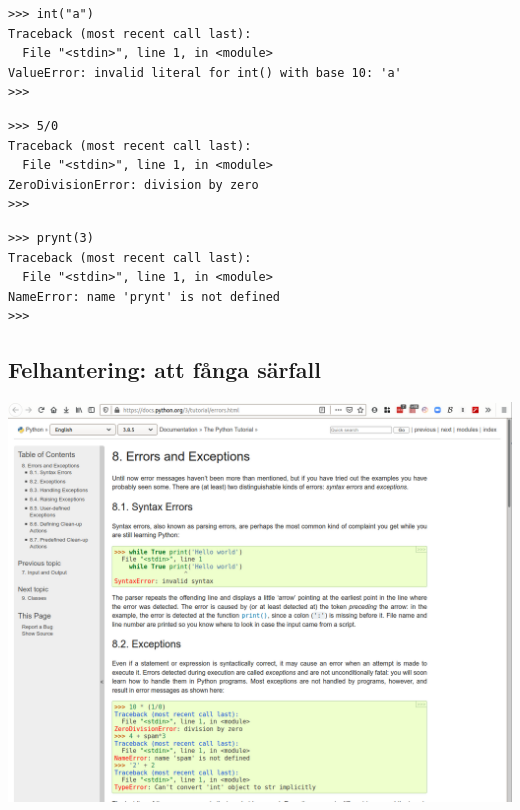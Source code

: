 \begin{frame}[fragile]
  \begin{example}
    \begin{verbatim}
>>> int("a")
Traceback (most recent call last):
  File "<stdin>", line 1, in <module>
ValueError: invalid literal for int() with base 10: 'a'
>>> 
    \end{verbatim}
  \end{example}
\end{frame}

\begin{frame}[fragile]
  \begin{example}
    \begin{verbatim}
>>> 5/0
Traceback (most recent call last):
  File "<stdin>", line 1, in <module>
ZeroDivisionError: division by zero
>>> 
    \end{verbatim}
  \end{example}
\end{frame}

\begin{frame}[fragile]
  \begin{example}
    \begin{verbatim}
>>> prynt(3)
Traceback (most recent call last):
  File "<stdin>", line 1, in <module>
NameError: name 'prynt' is not defined
>>> 
    \end{verbatim}
  \end{example}
\end{frame}

\subsection{Felhantering: att fånga särfall}

\begin{frame}
  \includegraphics[width=\columnwidth]{figs/docs-except.png}
\end{frame}

